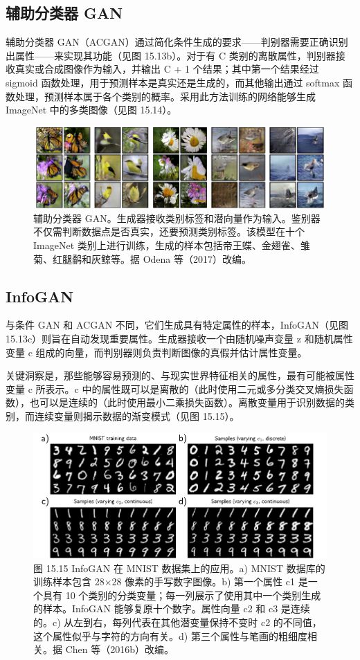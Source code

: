 \documentclass[lang=cn,newtx,10pt,scheme=chinese]{elegantbook}
\begin{document}
\subsection{辅助分类器 GAN}
辅助分类器 GAN（ACGAN）通过简化条件生成的要求——判别器需要正确识别出属性——来实现其功能（见图 15.13b）。对于有 C 类别的离散属性，判别器接收真实或合成图像作为输入，并输出 C + 1 个结果；其中第一个结果经过 sigmoid 函数处理，用于预测样本是真实还是生成的，而其他输出通过 softmax 函数处理，预测样本属于各个类别的概率。采用此方法训练的网络能够生成 ImageNet 中的多类图像（见图 15.14）。

\begin{figure}[ht!]
\centering
\includegraphics[width=0.7\linewidth]{PDFFigures/UDLChap15PDF/GANACGANResults.pdf}
\caption{辅助分类器 GAN。生成器接收类别标签和潜向量作为输入。鉴别器不仅需判断数据点是否真实，还要预测类别标签。该模型在十个 ImageNet 类别上进行训练，生成的样本包括帝王蝶、金翅雀、雏菊、红腿鹬和灰鲸等。据 Odena 等（2017）改编。}
\end{figure}


\subsection{InfoGAN}
与条件 GAN 和 ACGAN 不同，它们生成具有特定属性的样本，InfoGAN（见图 15.13c）则旨在自动发现重要属性。生成器接收一个由随机噪声变量 z 和随机属性变量 c 组成的向量，而判别器则负责判断图像的真假并估计属性变量。

关键洞察是，那些能够容易预测的、与现实世界特征相关的属性，最有可能被属性变量 c 所表示。c 中的属性既可以是离散的（此时使用二元或多分类交叉熵损失函数），也可以是连续的（此时使用最小二乘损失函数）。离散变量用于识别数据的类别，而连续变量则揭示数据的渐变模式（见图 15.15）。

\begin{figure}[ht!]
\centering
\includegraphics[width=0.7\linewidth]{PDFFigures/UDLChap15PDF/GanInfoGAN.pdf}
\caption{图 15.15 InfoGAN 在 MNIST 数据集上的应用。a) MNIST 数据库的训练样本包含 28×28 像素的手写数字图像。b) 第一个属性 c1 是一个具有 10 个类别的分类变量；每一列展示了使用其中一个类别生成的样本。InfoGAN 能够复原十个数字。属性向量 c2 和 c3 是连续的。c) 从左到右，每列代表在其他潜变量保持不变时 c2 的不同值，这个属性似乎与字符的方向有关。d) 第三个属性与笔画的粗细度相关。据 Chen 等（2016b）改编。}
\end{figure}
\end{document}
